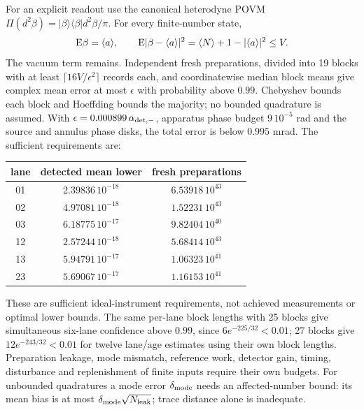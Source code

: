 \documentclass[10pt,twocolumn,letterpaper]{article}
\begin{document}
For an explicit readout use the canonical heterodyne POVM
$\Pi(d^2\beta)=|\beta\rangle\langle\beta|d^2\beta/\pi$.  For every finite-number
state,
\[
 {\rm E}\beta=\langle a\rangle,\qquad
 {\rm E}|\beta-\langle a\rangle|^2
 =\langle N\rangle+1-|\langle a\rangle|^2\leq V.
\]
The vacuum term remains.  Independent fresh preparations, divided into
19 blocks with at least $\lceil16V/\epsilon^2\rceil$ records each, and
coordinatewise median block means give complex mean error at most
$\epsilon$ with probability above $0.99$.  Chebyshev bounds each block and
Hoeffding bounds the majority; no bounded quadrature is assumed.
With $\epsilon=0.000899\,\alpha_{{\rm det},-}$, apparatus phase budget
$9\,10^{-5}$ rad and the source and annulus phase disks, the total error is
below $0.995$ mrad.  The sufficient requirements are:
\begin{center}\begin{tabular}{c|c|c}
 lane&detected mean lower&fresh preparations\\\hline
 01&$2.39836\,10^{-18}$&$6.53918\,10^{43}$\\
 02&$4.97081\,10^{-18}$&$1.52231\,10^{43}$\\
 03&$6.18775\,10^{-17}$&$9.82404\,10^{40}$\\
 12&$2.57244\,10^{-18}$&$5.68414\,10^{43}$\\
 13&$5.94791\,10^{-17}$&$1.06323\,10^{41}$\\
 23&$5.69067\,10^{-17}$&$1.16153\,10^{41}$
\end{tabular}\end{center}
These are sufficient ideal-instrument requirements, not achieved
measurements or optimal lower bounds.  The same per-lane block lengths with 25 blocks give simultaneous six-lane
confidence above $0.99$, since $6e^{-225/32}<0.01$; 27 blocks give
$12e^{-243/32}<0.01$ for twelve lane/age estimates using their own block
lengths.  Preparation leakage, mode mismatch,
reference work, detector gain, timing, disturbance and replenishment of
finite inputs require their own budgets.  For unbounded quadratures a mode
error $\delta_{\rm mode}$ needs an affected-number bound: its mean bias is at
most $\delta_{\rm mode}\sqrt{N_{\rm leak}}$; trace distance alone is inadequate.
\end{document}
